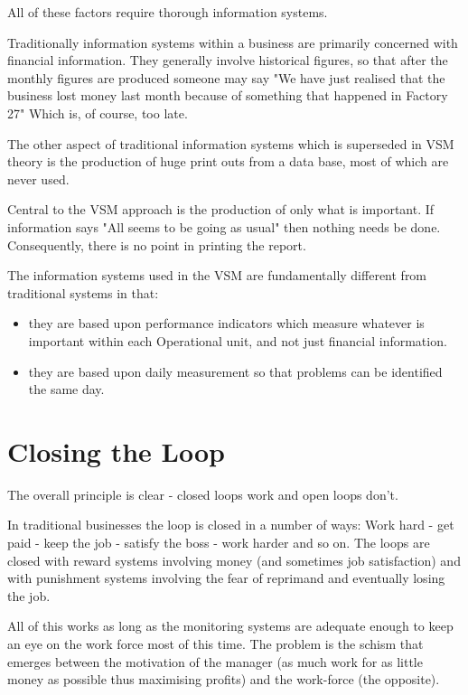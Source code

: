 All of these factors require thorough information systems.

Traditionally information systems within a business are primarily concerned with financial information. They generally involve historical figures, so that after the monthly figures are produced someone may say "We have just realised that the business lost money last month because of something that happened in Factory 27" Which is, of course, too late.

The other aspect of traditional information systems which is superseded in VSM theory is the production of huge print outs from a data base, most of which are never used.

Central to the VSM approach is the production of only what is important. If information says "All seems to be going as usual" then nothing needs be done. Consequently, there is no point in printing the report.

The information systems used in the VSM are fundamentally different from traditional systems in that:

\begin{itemize}
  \item they are based upon performance indicators which measure whatever is important within each Operational unit, and not just financial information.

  \item they are based upon daily measurement so that problems can be identified the same day.

\end{itemize}

\section*{Closing the Loop}
The overall principle is clear - closed loops work and open loops don't.

In traditional businesses the loop is closed in a number of ways: Work hard - get paid - keep the job - satisfy the boss - work harder and so on. The loops are closed with reward systems involving money (and sometimes job satisfaction) and with punishment systems involving the fear of reprimand and eventually losing the job.

All of this works as long as the monitoring systems are adequate enough to keep an eye on the work force most of this time. The problem is the schism that emerges between the motivation of the manager (as much work for as little money as possible thus maximising profits) and the work-force (the opposite).

